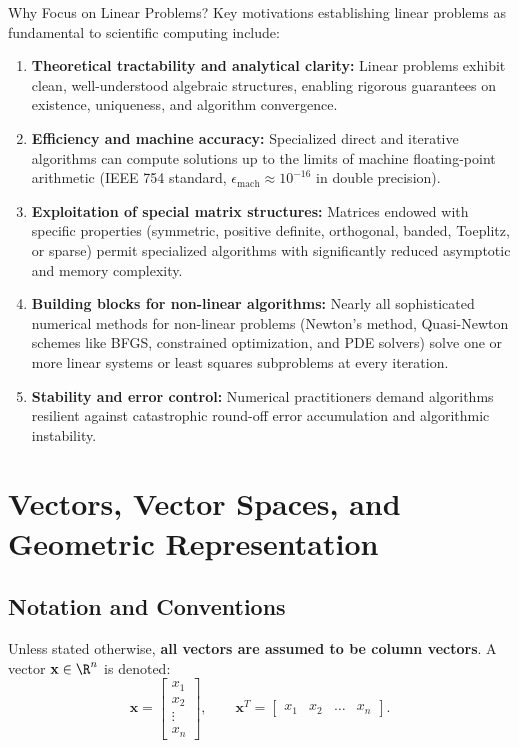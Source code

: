 \begin{noteblock}{Why Focus on Linear Problems?}
Key motivations establishing linear problems as fundamental to scientific computing include:
\begin{enumerate}
    \item \textbf{Theoretical tractability and analytical clarity:} Linear problems exhibit clean, well-understood algebraic structures, enabling rigorous guarantees on existence, uniqueness, and algorithm convergence.
    \item \textbf{Efficiency and machine accuracy:} Specialized direct and iterative algorithms can compute solutions up to the limits of machine floating-point arithmetic (IEEE 754 standard, $\epsilon_{\text{mach}} \approx 10^{-16}$ in double precision).
    \item \textbf{Exploitation of special matrix structures:} Matrices endowed with specific properties (symmetric, positive definite, orthogonal, banded, Toeplitz, or sparse) permit specialized algorithms with significantly reduced asymptotic and memory complexity.
    \item \textbf{Building blocks for non-linear algorithms:} Nearly all sophisticated numerical methods for non-linear problems (Newton's method, Quasi-Newton schemes like BFGS, constrained optimization, and PDE solvers) solve one or more linear systems or least squares subproblems at every iteration.
    \item \textbf{Stability and error control:} Numerical practitioners demand algorithms resilient against catastrophic round-off error accumulation and algorithmic instability.
\end{enumerate}
\end{noteblock}

\FloatBarrier
\section{Vectors, Vector Spaces, and Geometric Representation}

\subsection{Notation and Conventions}

Unless stated otherwise, \textbf{all vectors are assumed to be column vectors}. A vector $\mathbf{x} \in \R^n$ is denoted:
\begin{equation}
    \mathbf{x} = \begin{bmatrix} x_1 \\ x_2 \\ \vdots \\ x_n \end{bmatrix}, \qquad \mathbf{x}^T = \begin{bmatrix} x_1 & x_2 & \dots & x_n \end{bmatrix}.
\end{equation}

